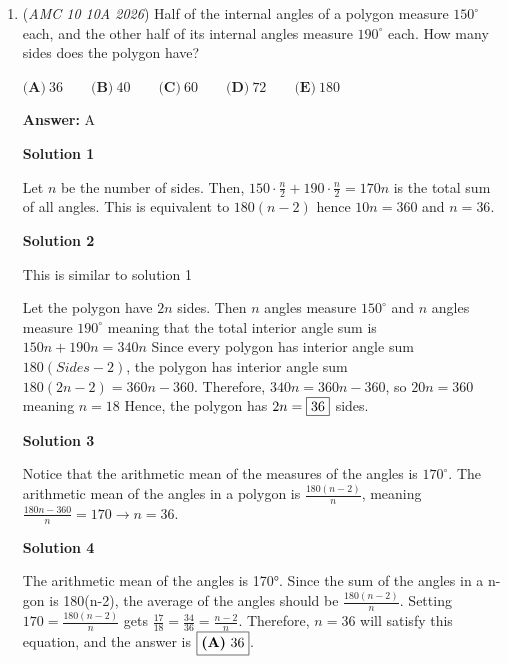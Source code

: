 \begin{enumerate}
 Note: the problem where this is linked is covered 1:20-2:05

 


	\item (\textit{AMC 10 10A 2026}) Half of the internal angles of a polygon measure $150^{\circ}$ each, and the other half of its internal angles measure $190^{\circ}$ each. How many sides does the polygon have?


 $\textbf{(A)}~36\qquad\textbf{(B)}~40\qquad\textbf{(C)}~60\qquad\textbf{(D)}~72\qquad\textbf{(E)}~180$

 \textbf{Answer: }A



\textbf{Solution 1}

Let $n$ be the number of sides. Then, $150 \cdot \frac{n}{2} + 190 \cdot \frac{n}{2} = 170n$ is the total sum of all angles. This is equivalent to $180(n-2)$ hence $10n = 360$ and $n = \boxed{36}$.

 



\textbf{Solution 2}

This is similar to solution 1

 Let the polygon have $2n$ sides. Then $n$ angles measure $150^\circ$ and $n$ angles measure $190^\circ$ meaning that the total interior angle sum is $150n+190n=340n$ Since every polygon has interior angle sum $180(Sides-2)$, the polygon has interior angle sum $180(2n-2)=360n-360$. Therefore, $340n=360n-360$, so $20n=360$ meaning $n=18$ Hence, the polygon has $2n=\fbox{36}$ sides.

 



\textbf{Solution 3}

Notice that the arithmetic mean of the measures of the angles is $170^\circ$. The arithmetic mean of the angles in a polygon is $\frac{180(n-2)}{n}$, meaning $\frac{180n-360}{n}=170 \to n=\boxed{36}$.

 



\textbf{Solution 4}

The arithmetic mean of the angles is 170°. Since the sum of the angles in a n-gon is 180(n-2), the average of the angles should be $\frac{180(n-2)}{n}$. Setting $170=\frac{180(n-2)}{n}$ gets $\frac{17}{18}=\frac{34}{36}=\frac{n-2}{n}$. Therefore, $n=36$ will satisfy this equation, and the answer is $\fbox{\textbf{(A)}\ 36}$.

 




\end{enumerate}
